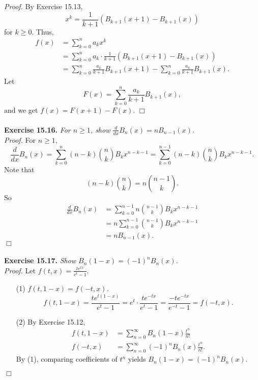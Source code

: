 \documentclass{article}
\begin{document}
\emph{Proof.}
By Exercise 15.13,
$$x^k = \frac{1}{k+1}(B_{k+1}(x+1) - B_{k+1}(x))$$
for $k \geq 0$.
Thus,
\begin{align*}
f(x)
&= \sum_{k=0}^{n} a_k x^k \\
&= \sum_{k=0}^{n} a_k \cdot \frac{1}{k+1} (B_{k+1}(x+1) - B_{k+1}(x)) \\
&= \sum_{k=0}^{n} \frac{a_k}{k+1} B_{k+1}(x+1) - \sum_{k=0}^{n} \frac{a_k}{k+1} B_{k+1}(x).
\end{align*}
Let
$$F(x) = \sum_{k=0}^{n} \frac{a_k}{k+1} B_{k+1}(x),$$
and we get $f(x) = F(x+1) - F(x)$.
$\Box$ \\\\



\textbf{Exercise 15.16.}
\emph{For $n \geq 1$, show $\frac{d}{dx}B_n(x) = nB_{n-1}(x)$.} \\

\emph{Proof.}
For $n \geq 1$,
$$\frac{d}{dx}B_n(x)
= \sum_{k=0}^{n}(n - k) {n \choose k} B_k x^{n - k - 1}
= \sum_{k=0}^{n-1}(n - k) {n \choose k} B_k x^{n - k - 1}.$$
Note that
$$(n-k) {n \choose k} = n {n-1 \choose k}.$$
So
\begin{align*}
\frac{d}{dx}B_n(x)
&= \sum_{k=0}^{n-1} n {n-1 \choose k} B_k x^{n - k - 1} \\
&= n \sum_{k=0}^{n-1} {n-1 \choose k} B_k x^{n - k - 1} \\
&= n B_{n-1}(x).
\end{align*}
$\Box$ \\\\



\textbf{Exercise 15.17.}
\emph{Show $B_n(1-x) = (-1)^n B_n(x)$.} \\

\emph{Proof.}
Let $f(t, x) = \frac{te^{tx}}{e^t - 1}$.
\begin{enumerate}
\item[(1)]
\emph{$f(t, 1-x) = f(-t, x)$.}
$$f(t, 1-x)
= \frac{te^{t(1-x)}}{e^t - 1}
= e^t \cdot \frac{te^{-tx}}{e^t - 1}
= \frac{-te^{-tx}}{e^{-t} - 1} = f(-t, x).$$
\item[(2)]
By Exercise 15.12,
\begin{align*}
f(t, 1-x)
&= \sum_{n=0}^{\infty} B_n(1-x) \frac{t^n}{n!} \\
f(-t, x)
&= \sum_{n=0}^{\infty} (-1)^n B_n(x) \frac{t^n}{n!}.
\end{align*}
By (1), comparing coefficients of $t^n$ yields
$B_n(1-x) = (-1)^n B_n(x)$.
\end{enumerate}
$\Box$ \\\\
\end{document}
